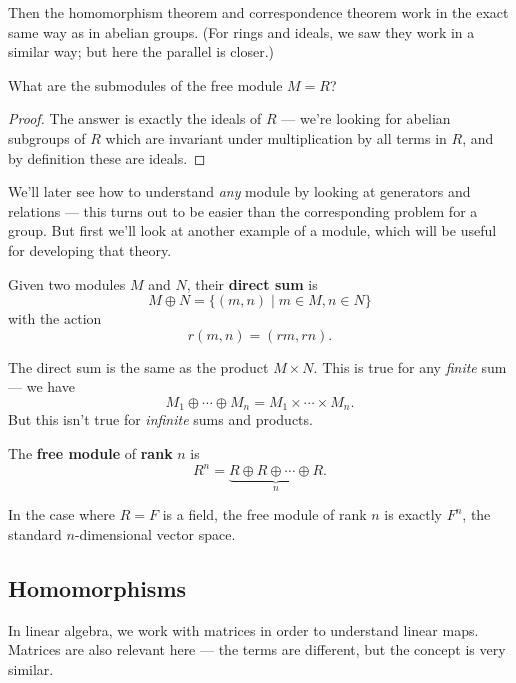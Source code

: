 Then the homomorphism theorem and correspondence theorem work in the exact same way as in abelian groups. (For rings and ideals, we saw they work in a similar way; but here the parallel is closer.)

\begin{example}
    What are the submodules of the free module $M = R$?
\end{example}

\begin{proof}
    The answer is exactly the ideals of $R$ --- we're looking for abelian subgroups of $R$ which are invariant under multiplication by all terms in $R$, and by definition these are ideals. 
\end{proof}

We'll later see how to understand \emph{any} module by looking at generators and relations --- this turns out to be easier than the corresponding problem for a group. But first we'll look at another example of a module, which will be useful for developing that theory. 

\begin{definition}
    Given two modules $M$ and $N$, their \textbf{direct sum} is \[M \oplus N = \{(m, n) \mid m \in M, n \in N\}\] with the action \[r(m, n) = (rm, rn).\] 
\end{definition}

\begin{note}
    The direct sum is the same as the product $M \times N$. This is true for any \emph{finite} sum --- we have \[M_1 \oplus \cdots \oplus M_n = M_1 \times \cdots \times M_n.\] But this isn't true for \emph{infinite} sums and products. 
\end{note}

\begin{definition}
    The \textbf{free module} of \textbf{rank} $n$ is \[R^n = \underbrace{R \oplus R \oplus \cdots \oplus R}_n.\] 
\end{definition}

In the case where $R = F$ is a field, the free module of rank $n$ is exactly $F^n$, the standard $n$-dimensional vector space. 

\subsection{Homomorphisms}

In linear algebra, we work with matrices in order to understand linear maps. Matrices are also relevant here --- the terms are different, but the concept is very similar. 

